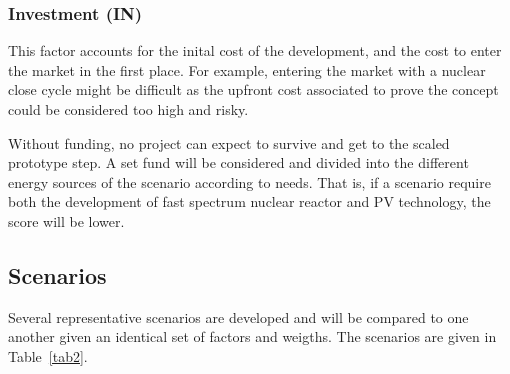 \documentclass[IJPHM, 2017, 29]{PHMSociety}
\begin{document}
\subsubsection{Investment (IN)}

This factor accounts for the inital cost of the development, and the cost to enter the market in the first place. For example, entering the market with a nuclear close cycle might be difficult as the upfront cost associated to prove the concept could be considered too high and risky.

Without funding, no project can expect to survive and get to the scaled prototype step. A set fund will be considered and divided into the different energy sources of the scenario according to needs. That is, if a scenario require both the development of fast spectrum nuclear reactor and PV technology, the score will be lower.

\subsection{Scenarios}
\label{sec:lfm}

Several representative scenarios are developed and will be compared to one another given an identical set of factors and weigths. The scenarios are given in Table~\ref{tab2}.
\end{document}
